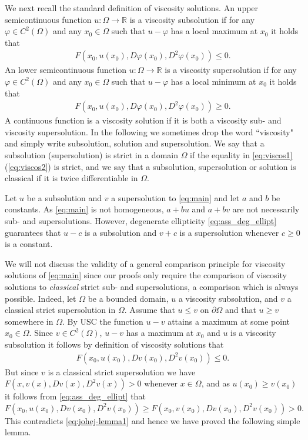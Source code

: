 \documentclass[12pt]{article}
\numberwithin{komcounter}{section}
\begin{document}
We next recall the standard definition of  viscosity solutions.
An upper semicontinuous function $u : \Omega \to \mathbb{R}$ is a viscosity subsolution %
if for any $\varphi \in C^2(\Omega)$ and any $x_0 \in \Omega$
such that $u - \varphi$ has a local maximum at $x_0$
it holds that
%
\begin{align}\label{eq:viscos1}
F(x_0,u(x_0),D\varphi(x_0),D^2\varphi(x_0)) \leq 0.
\end{align}
%
An lower semicontinuous function $u : \Omega \to \mathbb{R}$ is a viscosity supersolution %
if for any $\varphi \in C^2(\Omega)$ and any $x_0 \in \Omega$
such that $u - \varphi$ has a local minimum at $x_0$
it holds that
%
\begin{align}\label{eq:viscos2}
F(x_0,u(x_0),D\varphi(x_0),D^2\varphi(x_0)) \geq 0.
\end{align}
%
A continuous function is a viscosity solution if it is both a viscosity sub- and viscosity supersolution.
%
In the following we sometimes drop the word ``viscosity" and simply write subsolution, solution and supersolution.
We say that a subsolution (supersolution) is strict in a domain $\Omega$ if the equality in \eqref{eq:viscos1} (\eqref{eq:viscos2}) is strict,
and we say that a subsolution, supersolution or solution is classical if it is twice differentiable in $\Omega$.

Let $u$ be a subsolution and $v$ a supersolution to \eqref{eq:main} and let $a$ and $b$ be constants.
As \eqref{eq:main} is not homogeneous,  $a + b u$ and $a + b v$ are not necessarily sub- and supersolutions.
However, degenerate ellipticity \eqref{eq:ass_deg_ellipt} guarantees that $u - c$ is a subsolution
and $v + c$ is a supersolution whenever $c \geq 0$ is a constant.

We will not discuss the validity of a general comparison principle for viscosity solutions of \eqref{eq:main} since our
proofs only require the comparison of viscosity solutions to \textit{classical} strict sub- and supersolutions, a comparison which is always possible.
Indeed, let $\Omega$ be a bounded domain,
$u$ a viscosity subsolution, and $v$ a classical strict supersolution in $\Omega$. Assume that
$u \leq v$ on $\partial \Omega$ and that $u \geq v$ somewhere in $\Omega$.
By USC the function $u-v$ attains a maximum at some point $x_0 \in \Omega$.
Since $v \in C^2(\Omega)$, $u - v$ has a maximum at $x_0$ and $u$ is a viscosity subsolution it follows by definition of viscosity solutions that
%
\begin{align}\label{eq:johej-lemma1}
F(x_0, u(x_0), Dv(x_0), D^2 v(x_0)) \leq 0.
\end{align}
%
But since $v$ is a classical strict supersolution we have $F(x,v(x), Dv(x), D^2v(x)) > 0$ whenever $x \in \Omega$,
and as $u(x_0) \geq v(x_0)$ it follows from \eqref{eq:ass_deg_ellipt} that
%
$
F(x_0, u(x_0), Dv(x_0), D^2 v(x_0)) \geq F(x_0, v(x_0), Dv(x_0), D^2 v(x_0)) > 0.
$
%
This contradicts \eqref{eq:johej-lemma1} and hence we have proved the following simple lemma.
\end{document}
